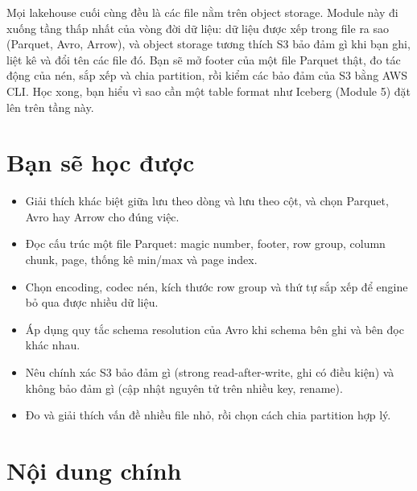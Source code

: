 
Mọi lakehouse cuối cùng đều là các file nằm trên object storage. Module này đi xuống tầng thấp nhất của vòng đời dữ liệu: dữ liệu được xếp trong file ra sao (Parquet, Avro, Arrow), và object storage tương thích S3 bảo đảm gì khi bạn ghi, liệt kê và đổi tên các file đó. Bạn sẽ mở footer của một file Parquet thật, đo tác động của nén, sắp xếp và chia partition, rồi kiểm các bảo đảm của S3 bằng AWS CLI. Học xong, bạn hiểu vì sao cần một table format như Iceberg (Module 5) đặt lên trên tầng này.

\section{Bạn sẽ học được}
\begin{itemize}
  \item Giải thích khác biệt giữa lưu theo dòng và lưu theo cột, và chọn Parquet, Avro hay Arrow cho đúng việc.
  \item Đọc cấu trúc một file Parquet: magic number, footer, row group, column chunk, page, thống kê min/max và page index.
  \item Chọn encoding, codec nén, kích thước row group và thứ tự sắp xếp để engine bỏ qua được nhiều dữ liệu.
  \item Áp dụng quy tắc schema resolution của Avro khi schema bên ghi và bên đọc khác nhau.
  \item Nêu chính xác S3 bảo đảm gì (strong read-after-write, ghi có điều kiện) và không bảo đảm gì (cập nhật nguyên tử trên nhiều key, rename).
  \item Đo và giải thích vấn đề nhiều file nhỏ, rồi chọn cách chia partition hợp lý.
\end{itemize}

\section{Nội dung chính}


